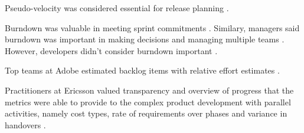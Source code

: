 Pseudo-velocity was considered essential for release planning
.

Burndown was valuable in meeting sprint commitments .
Similary, managers said burndown was important in making decisions and
managing multiple teams . However, developers didn't
consider burndown important .

Top teams at Adobe estimated backlog items with relative effort estimates
.

Practitioners at Ericsson valued transparency and overview of progress that
the metrics were able to provide to the complex product development with
parallel activities, namely cost types, rate of requirements over phases and
variance in handovers .








